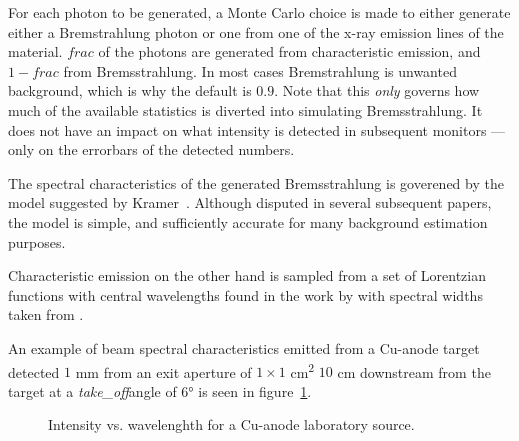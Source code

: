 For each photon to be generated, a Monte Carlo choice is made to either
generate either a Bremstrahlung photon or one from one of the x-ray emission
lines of the material. $\mathit{frac}$ of the photons are generated from characteristic
emission, and $1-\mathit{frac}$ from Bremsstrahlung. In most cases Bremstrahlung is
unwanted background, which is why the default is $0.9$. Note that this
\emph{only} governs how much of the available statistics is diverted into
simulating Bremsstrahlung. It does not have an impact on what intensity is detected
in subsequent monitors --- only on the errorbars of the detected numbers.

The spectral characteristics of the generated Bremsstrahlung is goverened by
the model suggested by Kramer~\cite{kramers1923}. Although disputed in several
subsequent papers, the model is simple, and sufficiently accurate for many
background estimation purposes.

Characteristic emission on the other hand is sampled from a set of Lorentzian
functions with central wavelengths found in the work by \cite{bearden1967x} with
spectral widths taken from \cite{krause1979natural}.

An example of beam spectral characteristics emitted from a Cu-anode target
detected $1$ mm  from an exit aperture of $1\times 1$ \si{cm\squared} $10$ \si{cm} downstream from the
target at a \textit{take\_off}angle of $6\si{\degree}$ is seen in
figure~\ref{f:source_lab_spectrum}.
\begin{figure}
\label{f:source_lab_spectrum}
\caption{Intensity vs. wavelenghth for a Cu-anode laboratory source.}
\end{figure}

